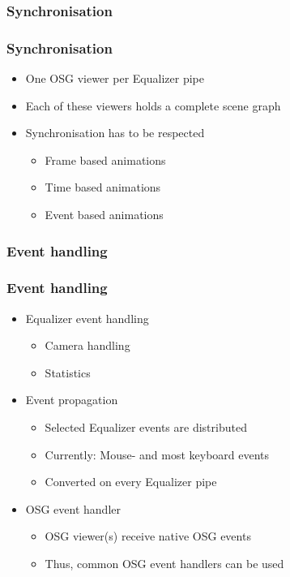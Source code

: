 \subsubsection*{Synchronisation}
\begin{frame}\frametitle{Synchronisation}
	\begin{itemize}
		\item<1-> One OSG viewer per Equalizer pipe
		\item<2-> Each of these viewers holds a complete scene graph
		\item<3-> Synchronisation has to be respected
		\begin{itemize}
			\item Frame based animations
			\item Time based animations
			\item Event based animations
		\end{itemize}
	\end{itemize}
\end{frame}

\subsubsection*{Event handling}
\begin{frame}\frametitle{Event handling}
	\begin{itemize}
		\item<1-> Equalizer event handling
		\begin{itemize}
			\item Camera handling
			\item Statistics
		\end{itemize}
		\item<2-> Event propagation
		\begin{itemize}
			\item Selected Equalizer events are distributed
			\item Currently: Mouse- and most keyboard events
			\item Converted on every Equalizer pipe
		\end{itemize}
		\item<3-> OSG event handler
		\begin{itemize}
			\item OSG viewer(s) receive native OSG events
			\item Thus, common OSG event handlers can be used
		\end{itemize}
	\end{itemize}
	
\end{frame}

